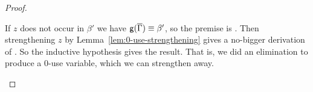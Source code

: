 \begin{proof}
\begin{itemize}
If $z$ does not occur in $\beta'$ we have $\mathsf{g}(\overline{\Gamma}) \equiv
\beta'$, so the premise is
.
Then strengthening $z$ by Lemma~\ref{lem:0-use-strengthening} gives a
no-bigger derivation of
.  So the
inductive hypothesis gives the result.  That is, we did an elimination
to produce a 0-use variable, which we can strengthen away.
\end{itemize}
\end{proof}


